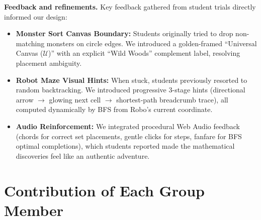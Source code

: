 \documentclass[11pt,a4paper]{article}
\begin{document}
\textbf{Feedback and refinements.}
Key feedback gathered from student trials directly informed our design:
\begin{itemize}
  \item \textbf{Monster Sort Canvas Boundary:} Students originally tried to drop non-matching monsters on circle edges. We introduced a golden-framed ``Universal Canvas ($\mathcal{U}$)'' with an explicit ``Wild Woods'' complement label, resolving placement ambiguity.
  \item \textbf{Robot Maze Visual Hints:} When stuck, students previously resorted to random backtracking. We introduced progressive 3-stage hints (directional arrow $\to$ glowing next cell $\to$ shortest-path breadcrumb trace), all computed dynamically by BFS from Robo's current coordinate.
  \item \textbf{Audio Reinforcement:} We integrated procedural Web Audio feedback (chords for correct set placements, gentle clicks for steps, fanfare for BFS optimal completions), which students reported made the mathematical discoveries feel like an authentic adventure.
\end{itemize}

\section{Contribution of Each Group Member}
\end{document}
